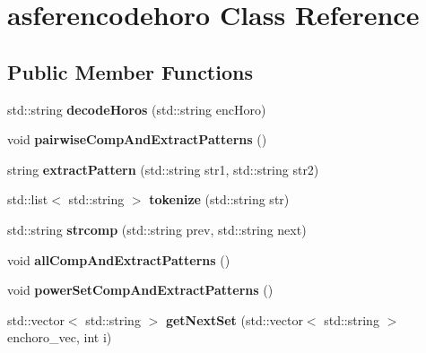 \hypertarget{classasferencodehoro}{\section{asferencodehoro Class Reference}
\label{classasferencodehoro}
}
\subsection*{Public Member Functions}
\begin{DoxyCompactItemize}
\item 
\hypertarget{classasferencodehoro_a30aa2fb3442f5b59c0a98fad0d79c514}{std\-::string {\bfseries decode\-Horos} (std\-::string enc\-Horo)}\label{classasferencodehoro_a30aa2fb3442f5b59c0a98fad0d79c514}

\item 
\hypertarget{classasferencodehoro_aa134813ae071051fb5f59efcf72d6380}{void {\bfseries pairwise\-Comp\-And\-Extract\-Patterns} ()}\label{classasferencodehoro_aa134813ae071051fb5f59efcf72d6380}

\item 
\hypertarget{classasferencodehoro_a5a9861b6c0ca35e9f6061281090677e6}{string {\bfseries extract\-Pattern} (std\-::string str1, std\-::string str2)}\label{classasferencodehoro_a5a9861b6c0ca35e9f6061281090677e6}

\item 
\hypertarget{classasferencodehoro_aae01ddeca58e94c7ef1d11122df829e0}{std\-::list$<$ std\-::string $>$ {\bfseries tokenize} (std\-::string str)}\label{classasferencodehoro_aae01ddeca58e94c7ef1d11122df829e0}

\item 
\hypertarget{classasferencodehoro_a61ee2943f2f9360429fbd53cb1674671}{std\-::string {\bfseries strcomp} (std\-::string prev, std\-::string next)}\label{classasferencodehoro_a61ee2943f2f9360429fbd53cb1674671}

\item 
\hypertarget{classasferencodehoro_a063d11dd7a23718e312caf2b8d5a2fa5}{void {\bfseries all\-Comp\-And\-Extract\-Patterns} ()}\label{classasferencodehoro_a063d11dd7a23718e312caf2b8d5a2fa5}

\item 
\hypertarget{classasferencodehoro_a5debda3074a7d146d9cb11a218338a59}{void {\bfseries power\-Set\-Comp\-And\-Extract\-Patterns} ()}\label{classasferencodehoro_a5debda3074a7d146d9cb11a218338a59}

\item 
\hypertarget{classasferencodehoro_a38764382c46efc636420e7fe956c691c}{std\-::vector$<$ std\-::string $>$ {\bfseries get\-Next\-Set} (std\-::vector$<$ std\-::string $>$ enchoro\-\_\-vec, int i)}\label{classasferencodehoro_a38764382c46efc636420e7fe956c691c}


\end{DoxyCompactItemize}
